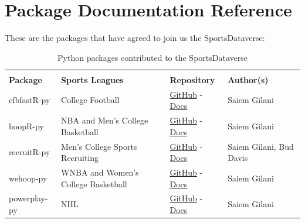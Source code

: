 \documentclass[12pt]{article}
\begin{document}
\section{Package Documentation Reference}
These are the packages that have agreed to join us the SportsDataverse:
\begin{table}[!htbp]
\centering
\renewcommand{\arraystretch}{1.3}
\begin{tabular}{>{\raggedright}m{1.0in} >{\raggedright}m{2.2in} >{\centering}m{0.8in} >{\raggedright\arraybackslash}m{2.0in}}
\toprule
\multicolumn{4}{c}{\textbf{Python Packages in the SportsDataverse}} \\
\textbf{Package} & \textbf{Sports Leagues} & \textbf{Repository} & \textbf{Author(s)} \\ 
 \midrule
    cfbfastR-py & College Football & \href{https://github.com/saiemgilani/cfbfastR-py/}{GitHub} - \href{https://cfbfastR-py.sportsdataverse.org/}{Docs} & Saiem Gilani\\
    hoopR-py & NBA and Men's College Basketball & \href{https://github.com/saiemgilani/hoopR-py/}{GitHub} - \href{https://hoopR-py.sportsdataverse.org}{Docs} & Saiem Gilani \\
    recruitR-py & Men's College Sports Recruiting & \href{https://github.com/saiemgilani/recruitR-py/}{GitHub} - \href{https://saiemgilani.github.io/recruitR/}{Docs} & Saiem Gilani, Bud Davis \\
    wehoop-py & WNBA and Women's College Basketball & \href{https://github.com/saiemgilani/wehoop-py}{GitHub} - \href{https://wehoop-py.sportsdataverse.org}{Docs} & Saiem Gilani \\
    powerplay-py & NHL & \href{https://github.com/saiemgilani/powerplay-py}{GitHub} - \href{https://saiemgilani.github.io/powerplay}{Docs} & Saiem Gilani \\
\bottomrule
\end{tabular}
\vspace{5pt}
\caption{Python packages contributed to the SportsDataverse}
\label{tbl:sdvpy}
\vspace{-7mm}
\end{table}
\end{document}
